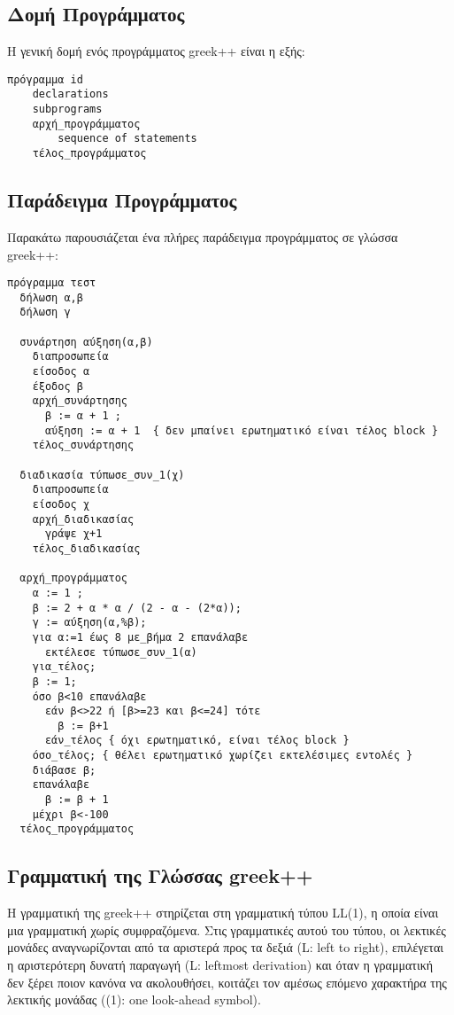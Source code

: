 \documentclass[12pt,a4paper]{article}
\begin{document}
\subsection{Δομή Προγράμματος}
Η γενική δομή ενός προγράμματος greek++ είναι η εξής:

\begin{verbatim}
πρόγραμμα id
    declarations
    subprograms
    αρχή_προγράμματος
        sequence of statements
    τέλος_προγράμματος
\end{verbatim}

\subsection{Παράδειγμα Προγράμματος}
Παρακάτω παρουσιάζεται ένα πλήρες παράδειγμα προγράμματος σε γλώσσα greek++:

\begin{verbatim}
πρόγραμμα τεστ
  δήλωση α,β
  δήλωση γ

  συνάρτηση αύξηση(α,β)
    διαπροσωπεία
    είσοδος α
    έξοδος β
    αρχή_συνάρτησης
      β := α + 1 ;
      αύξηση := α + 1  { δεν μπαίνει ερωτηματικό είναι τέλος block }
    τέλος_συνάρτησης

  διαδικασία τύπωσε_συν_1(χ)
    διαπροσωπεία
    είσοδος χ
    αρχή_διαδικασίας
      γράψε χ+1
    τέλος_διαδικασίας

  αρχή_προγράμματος
    α := 1 ;
    β := 2 + α * α / (2 - α - (2*α));
    γ := αύξηση(α,%β);
    για α:=1 έως 8 με_βήμα 2 επανάλαβε
      εκτέλεσε τύπωσε_συν_1(α)
    για_τέλος;
    β := 1;
    όσο β<10 επανάλαβε
      εάν β<>22 ή [β>=23 και β<=24] τότε
        β := β+1
      εάν_τέλος { όχι ερωτηματικό, είναι τέλος block }
    όσο_τέλος; { θέλει ερωτηματικό χωρίζει εκτελέσιμες εντολές }
    διάβασε β;
    επανάλαβε
      β := β + 1
    μέχρι β<-100
  τέλος_προγράμματος
\end{verbatim}

\subsection{Γραμματική της Γλώσσας greek++}
Η γραμματική της greek++ στηρίζεται στη γραμματική τύπου LL(1), η οποία είναι μια γραμματική χωρίς συμφραζόμενα. Στις γραμματικές αυτού του τύπου, οι λεκτικές μονάδες αναγνωρίζονται από τα αριστερά προς τα δεξιά (L: left to right), επιλέγεται η αριστερότερη δυνατή παραγωγή (L: leftmost derivation) και όταν η γραμματική δεν ξέρει ποιον κανόνα να ακολουθήσει, κοιτάζει τον αμέσως επόμενο χαρακτήρα της λεκτικής μονάδας ((1): one look-ahead symbol).
\end{document}
